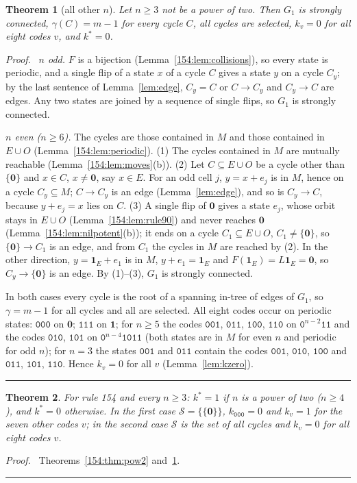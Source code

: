 \documentclass[10pt,a4paper]{article}
\newtheorem{theorem}{Theorem}[section]
\newcommand{\qedmark}{\rule{1.1ex}{1.1ex}}
\newenvironment{proof}[1][Proof]{\par\smallskip\noindent\textit{#1.}\ }{\hfill\qedmark\par\smallskip}
\newcommand{\zero}{\mathbf{0}}                %
\newcommand{\one}{\mathbf{1}}                 %
\newcommand{\Sel}{\mathcal{S}}                %
\newcommand{\Gone}{G_1}                       %
\newcommand{\kst}{k^{*}}
\newcommand{\code}[1]{\mathtt{#1}}            %
\begin{document}
\begin{theorem}[all other $n$]\label{154:thm:other}
Let $n\ge 3$ not be a power of two. Then $\Gone$ is strongly connected, $\gamma(C)=m-1$ for every cycle $C$, all
cycles are selected, $k_v=0$ for all eight codes $v$, and $\kst=0$.
\end{theorem}
\begin{proof}
\emph{$n$ odd.} $F$ is a bijection (Lemma~\ref{154:lem:collisions}), so every state is periodic, and a single flip
of a state $x$ of a cycle $C$ gives a state $y$ on a cycle $C_y$; by the last sentence of Lemma~\ref{lem:edge}, $C_y=C$ or
$C\to C_y$ and $C_y\to C$ are edges. Any two states are joined by a sequence of single flips, so $\Gone$ is strongly
connected.

\emph{$n$ even ($n\ge 6$).} The cycles are those contained in $M$ and those contained in $E\cup O$
(Lemma~\ref{154:lem:periodic}).
(1) The cycles contained in $M$ are mutually reachable (Lemma~\ref{154:lem:moves}(b)).
(2) Let $C\subseteq E\cup O$ be a cycle other than $\{\zero\}$ and $x\in C$, $x\neq\zero$, say $x\in E$. For an odd
cell $j$, $y=x+e_j$ is in $M$, hence on a cycle $C_y\subseteq M$; $C\to C_y$ is an edge (Lemma~\ref{lem:edge}), and
so is $C_y\to C$, because $y+e_j=x$ lies on $C$.
(3) A single flip of $\zero$ gives a state $e_j$, whose orbit stays in $E\cup O$ (Lemma~\ref{154:lem:rule90}) and
never reaches $\zero$ (Lemma~\ref{154:lem:nilpotent}(b)); it ends on a cycle $C_1\subseteq E\cup O$,
$C_1\neq\{\zero\}$, so $\{\zero\}\to C_1$ is an edge, and from $C_1$ the cycles in $M$ are reached by (2). In the
other direction, $y=\one_E+e_1$ is in $M$, $y+e_1=\one_E$ and $F(\one_E)=L\one_E=\zero$, so $C_y\to\{\zero\}$ is an
edge. By (1)--(3), $\Gone$ is strongly connected.

In both cases every cycle is the root of a spanning in-tree of edges of $\Gone$, so $\gamma=m-1$ for all cycles and
all are selected. All eight codes occur on periodic states: $\code{000}$ on $\zero$; $\code{111}$ on $\one$; for
$n\ge 5$ the codes $\code{001}$, $\code{011}$, $\code{100}$, $\code{110}$ on $\code{0}^{n-2}\code{11}$ and the codes
$\code{010}$, $\code{101}$ on $\code{0}^{n-4}\code{1011}$ (both states are in $M$ for even $n$ and periodic for odd
$n$); for $n=3$ the states $\code{001}$ and $\code{011}$ contain the codes $\code{001}$, $\code{010}$, $\code{100}$
and $\code{011}$, $\code{101}$, $\code{110}$. Hence $k_v=0$ for all $v$ (Lemma~\ref{lem:kzero}).
\end{proof}

\begin{theorem}\label{154:thm:main}
For rule 154 and every $n\ge 3$: $\kst=1$ if $n$ is a power of two ($n\ge 4$), and $\kst=0$ otherwise. In the first
case $\Sel=\{\{\zero\}\}$, $k_{\code{000}}=0$ and $k_v=1$ for the seven other codes $v$; in the second case $\Sel$
is the set of all cycles and $k_v=0$ for all eight codes $v$.
\end{theorem}
\begin{proof}
Theorems~\ref{154:thm:pow2} and~\ref{154:thm:other}.
\end{proof}
\end{document}
